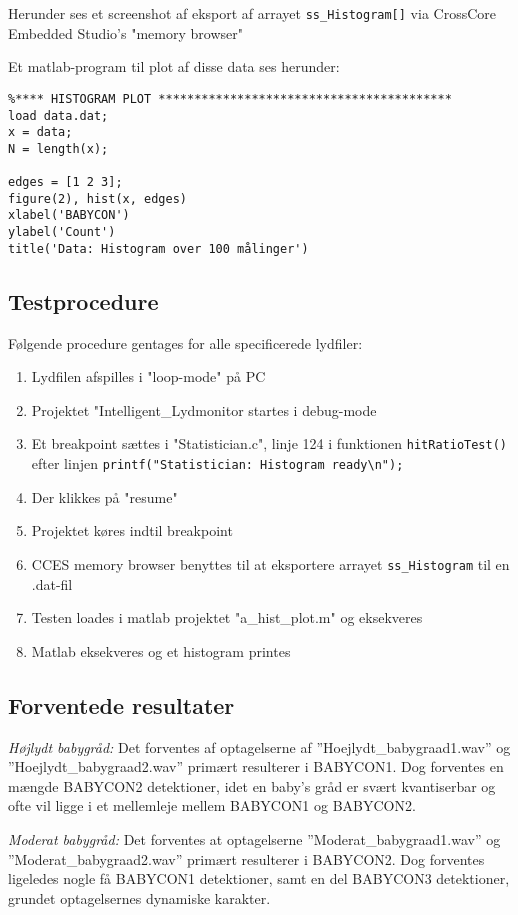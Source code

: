 Herunder ses et screenshot af eksport af arrayet \verb+ss_Histogram[]+ via CrossCore Embedded Studio's "memory browser" 

Et matlab-program til plot af disse data ses herunder:
\begin{verbatim}%**** HISTOGRAM PLOT *****************************************
load data.dat;
x = data;
N = length(x);

edges = [1 2 3];
figure(2), hist(x, edges)
xlabel('BABYCON')
ylabel('Count')
title('Data: Histogram over 100 målinger')
\end{verbatim}

\subsection*{Testprocedure}
Følgende procedure gentages for alle specificerede lydfiler:
\begin{enumerate}
	\item Lydfilen afspilles i "loop-mode" på PC
	\item Projektet "Intelligent\_Lydmonitor startes i debug-mode
	\item Et breakpoint sættes i "Statistician.c", linje 124 i funktionen \verb+hitRatioTest()+ efter linjen \verb+printf("Statistician: Histogram ready\n");+ 
	\item Der klikkes på "resume"
	\item Projektet køres indtil breakpoint
	\item CCES memory browser benyttes til at eksportere arrayet \verb+ss_Histogram+ til en .dat-fil
	\item Testen loades i matlab projektet "a\_hist\_plot.m" og eksekveres
	\item Matlab eksekveres og et histogram printes 
\end{enumerate}

\subsection*{Forventede resultater} 
\textit{Højlydt babygråd:} Det forventes af optagelserne af ''Hoejlydt\_babygraad1.wav'' og ''Hoejlydt\_babygraad2.wav'' primært resulterer i BABYCON1. Dog forventes en mængde BABYCON2 detektioner, idet en baby's gråd er svært kvantiserbar og ofte vil ligge i et mellemleje mellem BABYCON1 og BABYCON2. 

\textit{Moderat babygråd:} Det forventes at optagelserne ''Moderat\_babygraad1.wav'' og ''Moderat\_babygraad2.wav'' primært resulterer i BABYCON2. Dog forventes ligeledes nogle få BABYCON1 detektioner, samt en del BABYCON3 detektioner, grundet optagelsernes dynamiske karakter. 

